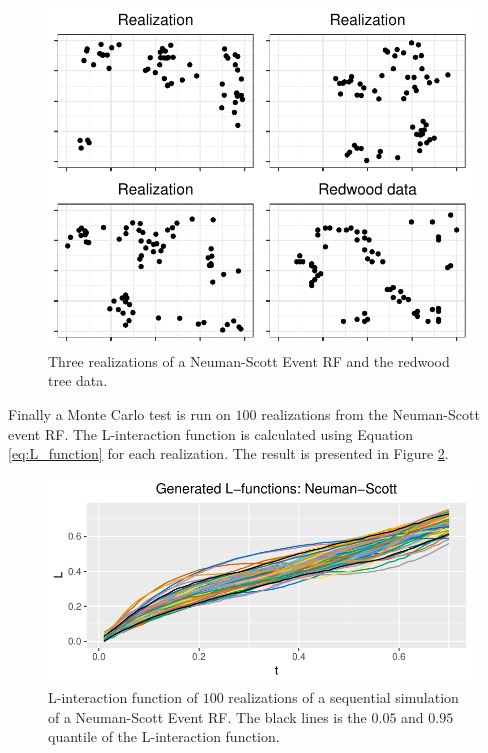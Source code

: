 \begin{figure}[H]
    \centering
    \includegraphics[scale=0.95]{figures/cluster_rel.pdf}
    \caption{Three realizations of a Neuman-Scott Event RF and the redwood tree data.}
    \label{fig:rel_rf}
\end{figure}

Finally a Monte Carlo test is run on $100$ realizations from the Neuman-Scott event RF. The L-interaction function is calculated using Equation \eqref{eq:L_function} for each realization. The result is presented in Figure \ref{fig:gen_ns_l}.

\begin{figure}[H]
    \centering
    \includegraphics[scale=0.95]{figures/gen_ns_l.pdf}
    \caption{L-interaction function of $100$ realizations of a sequential simulation of a Neuman-Scott Event RF. The black lines is the $0.05$ and $0.95$ quantile of the L-interaction function.}
    \label{fig:gen_ns_l}
\end{figure}

